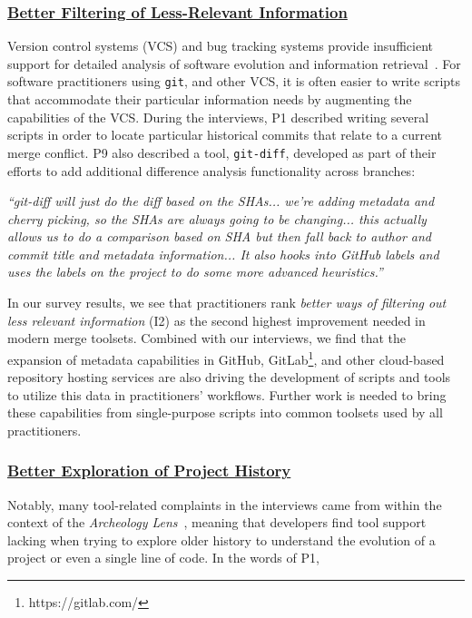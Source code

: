 \subsubsection{\underline{Better Filtering of Less-Relevant Information}}
Version control systems (VCS) and bug tracking systems provide insufficient support for detailed analysis of software evolution and information retrieval~\cite{fischer2003release_history}.
For software practitioners using \texttt{git}, and other VCS, it is often easier to write scripts that accommodate their particular information needs by augmenting the capabilities of the VCS.
During the interviews, P1 described writing several scripts in order to locate particular historical commits that relate to a current merge conflict.
P9 also described a tool, \texttt{git-diff}, developed as part of their efforts to add additional difference analysis functionality across branches:
\begin{displayquote}
\textit{``git-diff will just do the diff based on the SHAs... we're adding metadata and cherry picking, so the SHAs are always going to be changing... this actually allows us to do a comparison based on SHA but then fall back to author and commit title and metadata information... It also hooks into GitHub labels and uses the labels on the project to do some more advanced heuristics.''}
\end{displayquote}

In our survey results, we see that practitioners rank \textit{better ways of filtering out less relevant information} (I2) as the second highest improvement needed in modern merge toolsets.
Combined with our interviews, we find that the expansion of metadata capabilities in GitHub, GitLab\footnote{https://gitlab.com/}, and other cloud-based repository hosting services are also driving the development of scripts and tools to utilize this data in practitioners' workflows.
Further work is needed to bring these capabilities from single-purpose scripts into common toolsets used by all practitioners.

\subsubsection{\underline{Better Exploration of Project History}}
Notably, many tool-related complaints in the interviews came from within the context of the \textit{Archeology Lens}~\cite{mihai_lenses}, meaning that developers find tool support lacking when trying to explore older history to understand the evolution of a project or even a single line of code. In the words of P1, 

